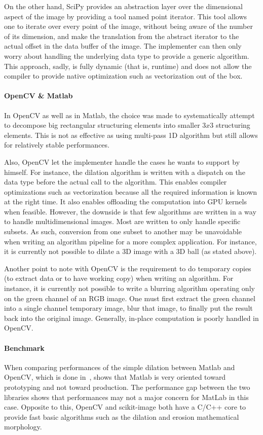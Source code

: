 On the other hand, SciPy provides an abstraction layer over the dimensional aspect of the image by providing a tool
named point iterator. This tool allows one to iterate over every point of the image, without being aware of the number
of its dimension, and make the translation from the abstract iterator to the actual offset in the data buffer of the
image. The implementer can then only worry about handling the underlying data type to provide a generic algorithm. This
approach, sadly, is fully dynamic (that is, runtime) and does not allow the compiler to provide native optimization such
as vectorization out of the box.

\paragraph{OpenCV \& Matlab} In OpenCV as well as in Matlab, the choice was made to systematically attempt to decompose
big rectangular structuring elements into smaller $3x3$ structuring elements. This is not as effective as using
multi-pass 1D algorithm but still allows for relatively stable performances.

Also, OpenCV let the implementer handle the cases he wants to support by himself. For instance, the dilation algorithm
is written with a dispatch on the data type before the actual call to the algorithm. This enables compiler optimizations
such as vectorization because all the required information is known at the right time. It also enables offloading the
computation into GPU kernels when feasible. However, the downside is that few algorithms are written in a way to handle
multidimensional images. Most are written to only handle specific subsets. As such, conversion from one subset to
another may be unavoidable when writing an algorithm pipeline for a more complex application. For instance, it is
currently not possible to dilate a 3D image with a 3D ball (as stated above).

Another point to note with OpenCV is the requirement to do temporary copies (to extract data or to have working copy)
when writing an algorithm. For instance, it is currently not possible to write a blurring algorithm operating only on
the green channel of an RGB image. One must first extract the green channel into a single channel temporary image,
blur that image, to finally put the result back into the original image. Generally, in-place computation is poorly
handled in OpenCV.

\paragraph{Benchmark} When comparing performances of the simple dilation between Matlab and OpenCV, which is done
in~\cite{matuska.2012.bench}, shows that Matlab is very oriented toward prototyping and not toward production. The
performance gap between the two libraries shows that performances may not a major concern for MatLab in this case.
Opposite to this, OpenCV and scikit-image both have a C/C++ core to provide fast basic algorithms such as the dilation
and erosion mathematical morphology.

